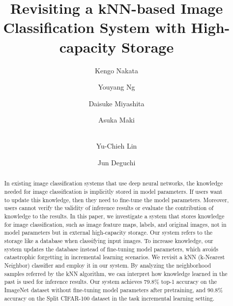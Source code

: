 \documentclass[runningheads]{llncs}
\begin{document}
\pagestyle{headings}
\mainmatter
\def\ECCVSubNumber{1552}  

\title{Revisiting a kNN-based Image Classification System with High-capacity Storage} 

\begin{comment}
\titlerunning{ECCV-22 submission ID \ECCVSubNumber} 
\authorrunning{ECCV-22 submission ID \ECCVSubNumber} 
\author{Anonymous ECCV submission}
\institute{Paper ID \ECCVSubNumber}
\end{comment}


\author{Kengo Nakata \and
Youyang Ng \and
Daisuke Miyashita \and
Asuka Maki \and \\
Yu-Chieh Lin \and
Jun Deguchi
}




\maketitle

\begin{abstract}
In existing image classification systems that use deep neural networks, the knowledge needed for image classification is implicitly stored in model parameters.
If users want to update this knowledge, then they need to fine-tune the model parameters.
Moreover, users cannot verify the validity of inference results or evaluate the contribution of knowledge to the results. 
In this paper, we investigate a system that stores knowledge for image classification,
such as image feature maps, labels, and original images, not in model parameters but in external high-capacity storage.
Our system refers to the storage like a database when classifying input images.
To increase knowledge, our system updates the database instead of fine-tuning model parameters,
which avoids catastrophic forgetting in incremental learning scenarios.
We revisit a kNN (k-Nearest Neighbor) classifier and employ it in our system.
By analyzing the neighborhood samples referred by the kNN algorithm, we can interpret how knowledge learned in the past is used for inference results.
Our system achieves 79.8\% top-1 accuracy on the ImageNet dataset without fine-tuning model parameters after pretraining,
and 90.8\% accuracy on the Split CIFAR-100 dataset in the task incremental learning setting.
\end{abstract}
\end{document}
